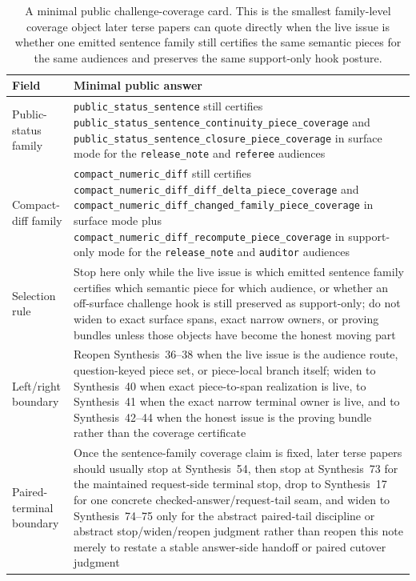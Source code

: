 \documentclass[11pt]{article}
\begin{document}
\begin{table}[t]
\centering
\small
\begin{tabularx}{\linewidth}{@{}LY@{}}
\toprule
Field & Minimal public answer \\
\midrule
Public-status family & \nolinkurl{public_status_sentence} still certifies \nolinkurl{public_status_sentence_continuity_piece_coverage} and \nolinkurl{public_status_sentence_closure_piece_coverage} in \textsf{surface} mode for the \nolinkurl{release_note} and \nolinkurl{referee} audiences \\
Compact-diff family & \nolinkurl{compact_numeric_diff} still certifies \nolinkurl{compact_numeric_diff_diff_delta_piece_coverage} and \nolinkurl{compact_numeric_diff_changed_family_piece_coverage} in \textsf{surface} mode plus \nolinkurl{compact_numeric_diff_recompute_piece_coverage} in \textsf{support-only} mode for the \nolinkurl{release_note} and \nolinkurl{auditor} audiences \\
Selection rule & Stop here only while the live issue is which emitted sentence family certifies which semantic piece for which audience, or whether an off-surface challenge hook is still preserved as \textsf{support-only}; do not widen to exact surface spans, exact narrow owners, or proving bundles unless those objects have become the honest moving part \\
Left/right boundary & Reopen Synthesis~36--38 when the live issue is the audience route, question-keyed piece set, or piece-local branch itself; widen to Synthesis~40 when exact piece-to-span realization is live, to Synthesis~41 when the exact narrow terminal owner is live, and to Synthesis~42--44 when the honest issue is the proving bundle rather than the coverage certificate \\
Paired-terminal boundary & Once the sentence-family coverage claim is fixed, later terse papers should usually stop at Synthesis~54, then stop at Synthesis~73 for the maintained request-side terminal stop, drop to Synthesis~17 for one concrete checked-answer/request-tail seam, and widen to Synthesis~74--75 only for the abstract paired-tail discipline or abstract stop/widen/reopen judgment rather than reopen this note merely to restate a stable answer-side handoff or paired cutover judgment \\
\bottomrule
\end{tabularx}
\caption{A minimal public challenge-coverage card. This is the smallest family-level coverage object later terse papers can quote directly when the live issue is whether one emitted sentence family still certifies the same semantic pieces for the same audiences and preserves the same support-only hook posture.}
\label{tab:minimal-public-challenge-coverage-card}
\end{table}
\end{document}

